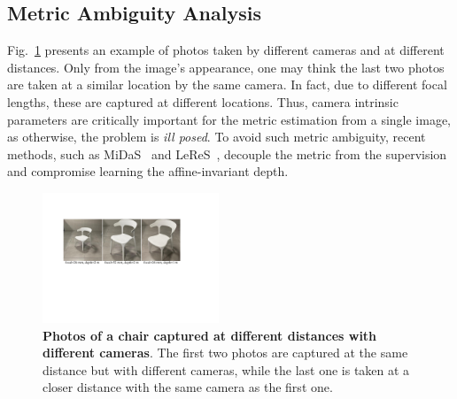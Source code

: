 \subsection{Metric Ambiguity Analysis}\label{sec:ambiguity}

Fig.~\ref{fig: inspiration} presents an example of photos taken by different cameras and at 
different distances. Only from the image's appearance, 
one may think 
the last two photos are taken at %
a 
similar location by the same camera. %
In fact, due to different focal lengths, 
these %
are captured at different locations.
Thus, 
camera %
intrinsic parameters are 
critically 
important for the metric estimation from a single image, as otherwise, the problem is \textit{ill posed}. 
To avoid such metric ambiguity, recent %
methods, such as MiDaS~\cite{Ranftl2020} and LeReS~\cite{leres}, decouple the metric from the supervision and %
compromise learning the affine-invariant depth.



\begin{figure}[!bt]
\centering
\includegraphics[width=0.47\textwidth]{./files/inspiration}
\vspace{-0.5 em}
\caption{\textbf{Photos of a chair captured at different distances with different cameras}. The first two photos are captured at the same distance but with different cameras, 
while the last one is taken at a closer distance with the same camera as the first one.}
\label{fig: inspiration}
\vspace{-1.5em}
\end{figure}

